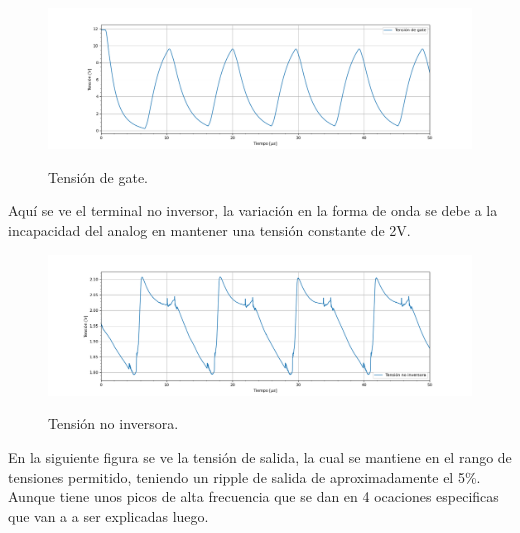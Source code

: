 \begin{figure}[H]
	\centering
	\includegraphics[width=0.9\linewidth]{ImagenesParteIV/Vgs.png}
	\label{fig:vgs_4}
	\caption{Tensión de gate.}
\end{figure}
Aquí se ve el terminal no inversor, la variación en la forma de onda se debe a la incapacidad del analog en mantener una tensión constante de 2V.
\begin{figure}[H]
	\centering	\includegraphics[width=0.9\linewidth]{ImagenesParteIV/Vni.png}
	\label{fig:vni_4}
	\caption{Tensión no inversora.}
\end{figure}

En la siguiente figura se ve  la tensión de salida, la cual se mantiene en el rango de tensiones permitido, teniendo un ripple de salida de aproximadamente el 5\%.  Aunque tiene unos picos de alta frecuencia que se dan en 4 ocaciones especificas que van a a ser explicadas luego.

